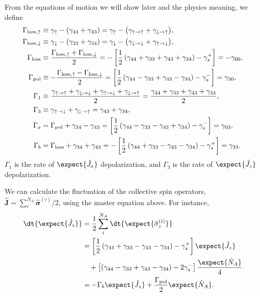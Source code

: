 \documentclass[]{report}
\newcommand{\gammauu}{\gamma_{\uparrow \rightarrow \uparrow}}
\newcommand{\gammadd}{\gamma_{\downarrow \rightarrow \downarrow}}
\newcommand{\gammaud}{\gamma_{\uparrow \rightarrow \downarrow}}
\newcommand{\gammadu}{\gamma_{\downarrow \rightarrow \uparrow}}
\begin{document}
From the equations of motion we will show later and the physics meaning, we define
\begin{align}
\Gamma_{\rm{loss},\uparrow} &\equiv \gamma_\uparrow - (\gamma_{44}+\gamma_{43})=\gamma_\uparrow - \big(\gammauu + \gammadu \big), \\
\Gamma_{\rm{loss},\downarrow} &\equiv \gamma_\downarrow - (\gamma_{33}+\gamma_{34})=\gamma_\downarrow - \big(\gammadd + \gammaud \big),\\
\Gamma_{\rm loss} &\equiv \frac{\Gamma_{\rm{loss},\uparrow} +\Gamma_{\rm{loss},\downarrow}}{2}=-\left[\frac{1}{2}\left(\gamma_{44}+\gamma_{33}+\gamma_{43}+\gamma_{34} \right)-\gamma_s^+\right]=-\gamma_{00}, \\
\Gamma_{\rm pol} &\equiv -\frac{\Gamma_{\rm{loss},\uparrow} - \Gamma_{\rm{loss},\downarrow}}{2}=\left[\frac{1}{2}\left(\gamma_{44}-\gamma_{33}+\gamma_{43}-\gamma_{34}\right) -\gamma_s^-\right]=\gamma_{30},\\
\Gamma_1 &\equiv \frac{\gammauu + \gammadd + \gammaud + \gammadu}{2}=\frac{\gamma_{44}+\gamma_{33}+\gamma_{43}+\gamma_{34}}{2},\\
\Gamma_3 &\equiv \gammaud+\gammadu=\gamma_{43}+\gamma_{34},\\
\Gamma_a &= \Gamma_{\rm pol}+\gamma_{34}-\gamma_{43}= \left[\frac{1}{2}\left(\gamma_{44}-\gamma_{33}-\gamma_{43}+\gamma_{34}\right) -\gamma_s^-\right]=\gamma_{03},\\
\Gamma_b &= \Gamma_{\rm loss}+\gamma_{34}+\gamma_{43}=-\left[\frac{1}{2}\left(\gamma_{44}+\gamma_{33}-\gamma_{43}-\gamma_{34} \right)-\gamma_s^+\right]=\gamma_{33} .
\end{align}
$ \Gamma_1 $ is the rate of $ \expect{\hat{J}_x} $ depolarization, and $ \Gamma_3 $ is the rate of $ \expect{\hat{J}_z} $ depolarization. 

We can calculate the fluctuation of the collective spin operators, $ \hat{\mathbf{J}}=\sum_i^{N_A}\hat{\boldsymbol{\sigma}}^{(i)}/2 $, using the master equation above. 
For instance, 
\begin{align}
\dt{\expect{\hat{J}_z}} &= \frac{1}{2}\sum_i^{N_A} \dt{\expect{\hat{\sigma}_z^{(i)}}}\\
&= \left[\frac{1}{2}\left(\gamma_{44}+\gamma_{33}-\gamma_{43}-\gamma_{34} \right)-\gamma_s^+\right]\expect{\hat{J}_z} \nonumber \\
&\quad + \left[\left(\gamma_{44} -\gamma_{33}+\gamma_{43}-\gamma_{34}\right)- 2\gamma_s^-\right] \frac{\expect{\hat{N}_A}}{4}\\
&= -\Gamma_b \expect{\hat{J}_z} +\frac{\Gamma_{\rm pol}}{2}\expect{\hat{N}_A}.\label{eq:expJzeq}
\end{align}
\end{document}
